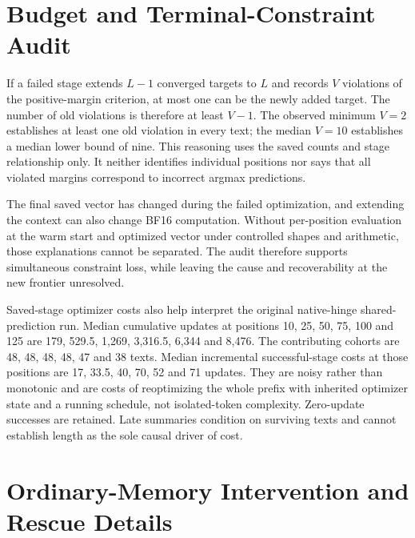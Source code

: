 \section{Budget and Terminal-Constraint Audit}
\label{app:terminal}

\begin{table}[htbp]
 \centering
 \small
 \resizebox{\columnwidth}{!}{}
 \caption{Saved terminal stages of the native shared-prediction fixed-trajectory extension. Violations concern the recorded positive-margin convergence criterion. The old-constraint count is a lower bound obtained by allowing the single added target to account for one violation.}
 \label{tab:terminal}
\end{table}

If a failed stage extends $L-1$ converged targets to $L$ and records $V$ violations of the positive-margin criterion, at most one can be the newly added target.
The number of old violations is therefore at least $V-1$.
The observed minimum $V=2$ establishes at least one old violation in every text; the median $V=10$ establishes a median lower bound of nine.
This reasoning uses the saved counts and stage relationship only.
It neither identifies individual positions nor says that all violated margins correspond to incorrect argmax predictions.

The final saved vector has changed during the failed optimization, and extending the context can also change BF16 computation.
Without per-position evaluation at the warm start and optimized vector under controlled shapes and arithmetic, those explanations cannot be separated.
The audit therefore supports simultaneous constraint loss, while leaving the cause and recoverability at the new frontier unresolved.

Saved-stage optimizer costs also help interpret the original native-hinge shared-prediction run.
Median cumulative updates at positions 10, 25, 50, 75, 100 and 125 are 179, 529.5, 1,269, 3,316.5, 6,344 and 8,476.
The contributing cohorts are 48, 48, 48, 48, 47 and 38 texts.
Median incremental successful-stage costs at those positions are 17, 33.5, 40, 70, 52 and 71 updates.
They are noisy rather than monotonic and are costs of reoptimizing the whole prefix with inherited optimizer state and a running schedule, not isolated-token complexity.
Zero-update successes are retained.
Late summaries condition on surviving texts and cannot establish length as the sole causal driver of cost.

\section{Ordinary-Memory Intervention and Rescue Details}
\label{app:mechanism}

